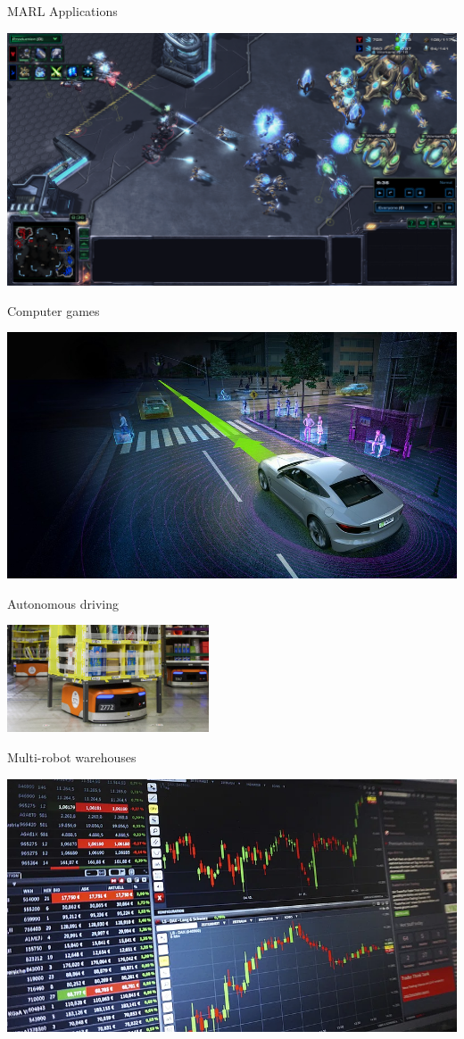 \begin{frame}[t]{MARL Applications}
    \centering
    \begin{minipage}{.5\linewidth}
        \centering
        \includegraphics[width=.65\linewidth, keepaspectratio]{images/1_starcraft.png}
        
        Computer games
    \end{minipage}%
    \begin{minipage}{.5\linewidth}
        \centering
        \includegraphics[width=.65\linewidth, keepaspectratio]{images/1_self_driving.png}
        
        Autonomous driving
    \end{minipage}
    
    \begin{minipage}{.5\linewidth}
        \centering
        \includegraphics[width=.65\linewidth, keepaspectratio]{images/1_reware.png}
        
        Multi-robot warehouses
    \end{minipage}%
    \begin{minipage}{.5\linewidth}
        \centering
        \includegraphics[width=.65\linewidth, keepaspectratio]{images/1_trading.png}
        

\end{minipage}
\end{frame}
